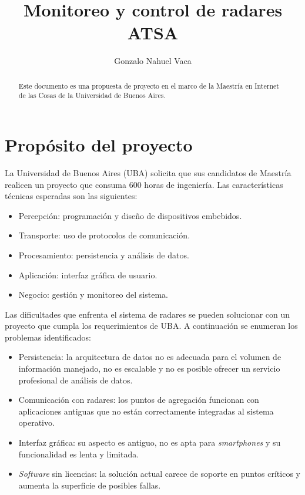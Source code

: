 \documentclass[
12pt,
spanish,
singlespacing,
parskip,
headsepline,]{article}
\title{Monitoreo y control de radares ATSA}
\author{Gonzalo Nahuel Vaca}
\begin{document}
\maketitle
\thispagestyle{empty}

\begin{abstract}

Este documento es una propuesta de proyecto en el marco de la Maestría en Internet de las Cosas de la Universidad de Buenos Aires.

\end{abstract}

\newpage

\tableofcontents

\newpage

\section{Propósito del proyecto}

La Universidad de Buenos Aires (UBA) solicita que sus candidatos de Maestría realicen un proyecto que consuma 600 horas de ingeniería.
Las características técnicas esperadas son las siguientes:

\begin{itemize}
	\item Percepción: programación y diseño de dispositivos embebidos.
	\item Transporte: uso de protocolos de comunicación.
	\item Procesamiento: persistencia y análisis de datos.
	\item Aplicación: interfaz gráfica de usuario.
	\item Negocio: gestión y monitoreo del sistema.
\end{itemize}

Las dificultades que enfrenta el sistema de radares se pueden solucionar con un proyecto que cumpla los requerimientos de UBA.
A continuación se enumeran los problemas identificados:

\begin{itemize}
	\item Persistencia: la arquitectura de datos no es adecuada para el volumen de información manejado, no es escalable y no es posible ofrecer un servicio profesional de análisis de datos.
	\item Comunicación con radares: los puntos de agregación funcionan con aplicaciones antiguas que no están correctamente integradas al sistema operativo.
	\item Interfaz gráfica: su aspecto es antiguo, no es apta para \emph{smartphones} y su funcionalidad es lenta y limitada.
	\item \emph{Software} sin licencias: la solución actual carece de soporte en puntos críticos y aumenta la superficie de posibles fallas.
\end{itemize}
\end{document}
